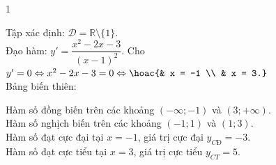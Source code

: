 \begin{vd}
{\begin{enumEX}[a)]{1}
		\item Tập xác định: $\mathscr{D} = \mathbb{R} \setminus \{1\}$.\\
				Đạo hàm: 
				$y' =  \dfrac{x^2 - 2x - 3}{(x - 1)^2}$. Cho $y' = 0 \Leftrightarrow x^2 - 2x - 3 = 0 \Leftrightarrow \hoac{& x = -1 \\ & x = 3.}$\\
				Bảng biến thiên:
				\begin{center}
				\end{center}
			Hàm số đồng biến trên các khoảng $(-\infty; -1)$ và $(3; +\infty)$.\\
			Hàm số nghịch biến trên các khoảng $(-1; 1)$ và $(1; 3)$.\\
			Hàm số đạt cực đại tại $x = -1$, giá trị cực đại $y_{CĐ} = -3$.\\
			Hàm số đạt cực tiểu tại $x = 3$, giá trị cực tiểu $y_{CT} = 5$.
				

\end{enumEX}}
\end{vd}

